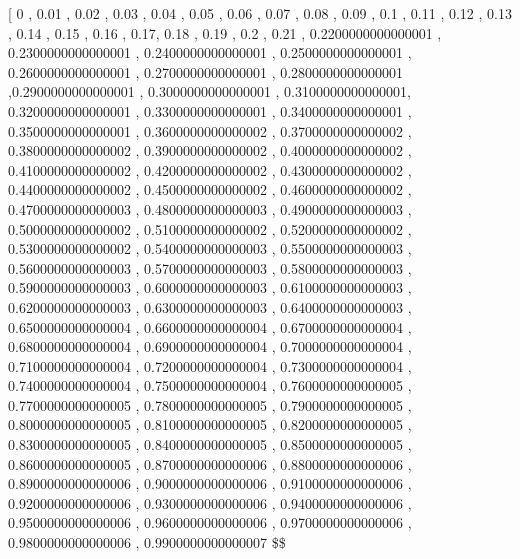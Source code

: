 \documentclass[
]{book}
\begin{document}
{[} 0 , 0.01 , 0.02 , 0.03 , 0.04 , 0.05 , 0.06 , 0.07 , 0.08 , 0.09 , 0.1 , 0.11 , 0.12 , 0.13 , 0.14 , 0.15 , 0.16 , 0.17, 0.18 , 0.19 , 0.2 , 0.21 , 0.2200000000000001 , 0.2300000000000001 , 0.2400000000000001 , 0.2500000000000001 , 0.2600000000000001 , 0.2700000000000001 , 0.2800000000000001 ,0.2900000000000001 , 0.3000000000000001 , 0.3100000000000001, 0.3200000000000001 , 0.3300000000000001 , 0.3400000000000001 , 0.3500000000000001 , 0.3600000000000002 , 0.3700000000000002 , 0.3800000000000002 , 0.3900000000000002 , 0.4000000000000002 , 0.4100000000000002 , 0.4200000000000002 , 0.4300000000000002 , 0.4400000000000002 , 0.4500000000000002 , 0.4600000000000002 , 0.4700000000000003 , 0.4800000000000003 , 0.4900000000000003 , 0.5000000000000002 , 0.5100000000000002 , 0.5200000000000002 , 0.5300000000000002 , 0.5400000000000003 , 0.5500000000000003 , 0.5600000000000003 , 0.5700000000000003 , 0.5800000000000003 , 0.5900000000000003 , 0.6000000000000003 , 0.6100000000000003 , 0.6200000000000003 , 0.6300000000000003 , 0.6400000000000003 , 0.6500000000000004 , 0.6600000000000004 , 0.6700000000000004 , 0.6800000000000004 , 0.6900000000000004 , 0.7000000000000004 , 0.7100000000000004 , 0.7200000000000004 , 0.7300000000000004 , 0.7400000000000004 , 0.7500000000000004 , 0.7600000000000005 , 0.7700000000000005 , 0.7800000000000005 , 0.7900000000000005 , 0.8000000000000005 , 0.8100000000000005 , 0.8200000000000005 , 0.8300000000000005 , 0.8400000000000005 , 0.8500000000000005 , 0.8600000000000005 , 0.8700000000000006 , 0.8800000000000006 , 0.8900000000000006 , 0.9000000000000006 , 0.9100000000000006 , 0.9200000000000006 , 0.9300000000000006 , 0.9400000000000006 , 0.9500000000000006 , 0.9600000000000006 , 0.9700000000000006 , 0.9800000000000006 , 0.9900000000000007 \right{]}\$\$
\end{document}
